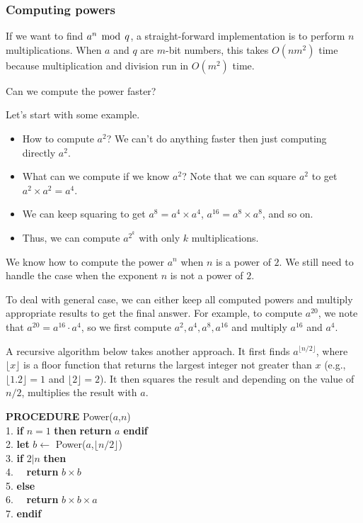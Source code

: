 \begin{frame}\frametitle{Computing powers}
  If we want to find $a^n\,\bmod\, q$, a straight-forward implementation is
  to perform $n$ multiplications.  When $a$ and $q$ are $m$-bit
  numbers, this takes $O(nm^2)$ time because multiplication and
  division run in $O(m^2)$ time.

  Can we compute the power faster?

  Let's start with some example.
  \begin{itemize}
  \item How to compute $a^2$?  We can't do anything faster then just
    computing directly $a^2$.
  \item What can we compute if we know $a^2$?  Note that we can square
    $a^2$ to get $a^2\times a^2=a^4$.
  \item We can keep squaring to get $a^8=a^4\times a^4$,
    $a^{16}=a^8\times a^8$, and so on.
  \item Thus, we can compute $a^{2^k}$ with only $k$ multiplications.
  \end{itemize}

  We know how to compute the power $a^n$ when $n$ is a power of $2$.
  We still need to handle the case when the exponent $n$ is not a
  power of $2$.
\end{frame}

\begin{frame}
  To deal with general case, we can either keep all computed powers
  and multiply appropriate results to get the final answer.  For
  example, to compute $a^{20}$, we note that $a^{20}=a^{16}\cdot a^4$,
  so we first compute $a^2,a^4,a^8,a^{16}$ and multiply $a^{16}$ and
  $a^4$.

  \vspace{0.1in} A recursive algorithm below takes another approach.
  It first finds $a^{\lfloor n/2\rfloor}$, where $\lfloor x\rfloor$ is
  a floor function that returns the largest integer not greater than
  $x$ (e.g., $\lfloor 1.2\rfloor=1$ and $\lfloor 2\rfloor=2$).  It
  then squares the result and depending on the value of $n/2$,
  multiplies the result with $a$.

  \begin{tcolorbox}
    {\bf PROCEDURE} Power($a$,$n$)\\
    1. {\bf if} $n=1$ {\bf then} {\bf return} $a$ {\bf endif}\\
    2. {\bf let} $b\leftarrow$ Power($a$,$\lfloor n/2\rfloor$)\\
    3. {\bf if} $2|n$ {\bf then} \\
    4. \ \ {\bf return} $b\times b$ \\
    5. {\bf else}\\
    6. \ \ {\bf return} $b\times b\times a$ \\
    7. {\bf endif}
  \end{tcolorbox}

\end{frame}

